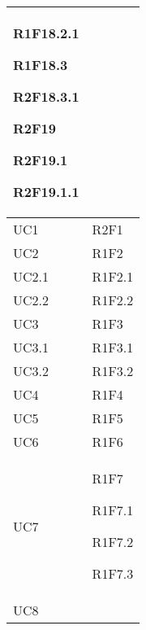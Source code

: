 \begin{center}
\begin{longtable}{|p{44mm}|p{22mm}|}
R1F18.2.1 \newline

R1F18.3 \newline

R2F18.3.1 \newline

R2F19 \newline

R2F19.1 \newline

R2F19.1.1 \newline
\\
\hline
UC1 &

R2F1 \newline
\\
\hline
UC2 &

R1F2 \newline
\\
\hline
UC2.1 &

R1F2.1 \newline
\\
\hline
UC2.2 &

R1F2.2 \newline
\\
\hline
UC3 &

R1F3 \newline
\\
\hline
UC3.1 &

R1F3.1 \newline
\\
\hline
UC3.2 &

R1F3.2 \newline
\\
\hline
UC4 &

R1F4 \newline
\\
\hline
UC5 &

R1F5 \newline
\\
\hline
UC6 &

R1F6 \newline
\\
\hline
UC7 &

R1F7 \newline

R1F7.1 \newline

R1F7.2 \newline

R1F7.3 \newline
\\
\hline
UC8 &


\end{longtable}
\end{center}
